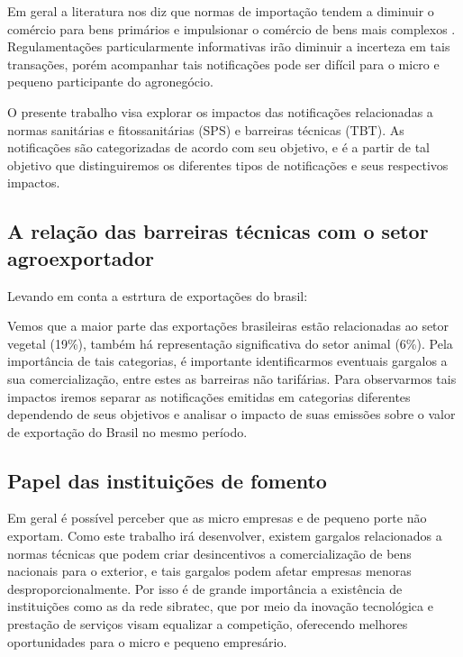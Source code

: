 \documentclass[12pt, a4paper]{article}
\begin{document}
Em geral a literatura  nos diz que normas de importação tendem a diminuir o comércio para bens primários e impulsionar o comércio de bens mais complexos \cite{moenius}. Regulamentações particularmente informativas irão diminuir a incerteza em tais transações, porém acompanhar tais notificações pode ser difícil para o micro e pequeno participante do agronegócio. 

O presente trabalho visa explorar os impactos das notificações relacionadas a normas sanitárias e fitossanitárias  (SPS) e barreiras técnicas  (TBT). As notificações são categorizadas de acordo com seu objetivo, e é a partir de tal objetivo que distinguiremos os diferentes tipos de notificações e seus respectivos impactos.

\subsection{A relação das barreiras técnicas com o setor agroexportador}

Levando em conta a estrtura de exportações do brasil:



Vemos que a maior parte das exportações brasileiras estão relacionadas ao setor vegetal (19\%), também há representação significativa do setor animal (6\%). Pela importância de tais categorias, é importante identificarmos eventuais gargalos a sua comercialização, entre estes as barreiras não tarifárias. Para observarmos  tais impactos iremos separar as notificações emitidas em categorias diferentes dependendo de seus objetivos e analisar o impacto de suas emissões sobre o valor de exportação do Brasil no mesmo período.

\newpage

\subsection{Papel das instituições de fomento}



Em geral é possível perceber que as micro empresas e de pequeno porte não exportam. Como este trabalho irá desenvolver, existem gargalos relacionados a normas técnicas que podem criar desincentivos a comercialização de bens nacionais para o exterior, e tais gargalos podem afetar empresas menoras desproporcionalmente. Por isso é de grande importância a existência de instituições como as da rede sibratec, que por meio da inovação tecnológica e prestação de serviços visam equalizar a competição, oferecendo melhores oportunidades para o micro e pequeno empresário.
\end{document}
